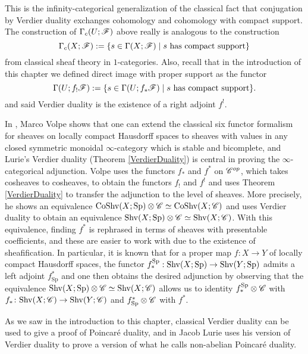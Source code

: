 \documentclass[../../thesis.tex]{subfiles}
\begin{document}
\begin{remark}
    This is the infinity-categorical generalization of the classical fact that conjugation by Verdier duality exchanges cohomology and cohomology with compact support.
    The construction of $\Gamma_c(U;\mathscr{F})$ above really is analogous to the construction
    \[
        \Gamma_c(X ; \mathscr{F}) := \{ s \in \Gamma(X; \mathscr{F}) \mid s\text{ has compact support}\}
    \]
    from classical sheaf theory in $1$-categories.
    Also, recall that in the introduction of this chapter we defined direct image with proper support as the functor
    \[
        \Gamma(U; f_!\mathscr{F}) : = \{ s \in \Gamma(U; f_*\mathscr{F}) \mid s \text{ has compact support}\}.
    \]
    and said Verdier duality is the existence of a right adjoint $f^!$.


    In \cite{Volpe}, Marco Volpe shows that one can extend the classical six functor formalism for sheaves on locally compact Hausdorff spaces to sheaves with values in any closed symmetric monoidal $\infty$-category which is stable and bicomplete, and Lurie's Verdier duality (Theorem \ref{VerdierDuality}) is central in proving the $\infty$-categorical adjunction.
    Volpe uses the functors $f_*$ and $f^*$ on $\mathscr{C}^{op}$, which takes cosheaves to cosheaves, to obtain the functors $f_!$ and $f^!$ and uses Theorem \ref{VerdierDuality} to transfer the adjunction to the level of sheaves.
    More precisely, he shows an equivalence $\operatorname{CoShv}(X ; \mathrm{Sp}) \otimes \mathscr{C} \simeq \operatorname{CoShv}(X ; \mathscr{C})$ and uses Verdier duality to obtain an equivalence $\mathrm{Shv}(X;\mathrm{Sp})\otimes \mathscr{C} \simeq \mathrm{Shv}(X;\mathscr{C})$.
    With this equivalence, finding $f^*$ is rephrased in terms of sheaves with presentable coefficients, and these are easier to work with due to the existence of sheafification.
    In particular, it is known that for a proper map $f\colon X\to Y$ of locally compact Hausdorff spaces, the functor $f_*^{\mathrm{Sp}}:\mathrm{Shv}(X;\mathrm{Sp})\to \mathrm{Shv}(Y;\mathrm{Sp})$ admits a left adjoint $f_{\mathrm{Sp}}^*$ and one then obtains the desired adjunction by observing that the equivalence $\mathrm{Shv}(X;\mathrm{Sp})\otimes \mathscr{C} \simeq \mathrm{Shv}(X;\mathscr{C})$ allows us to identity $f_*^{\mathrm{Sp}}\otimes \mathscr{C}$ with $f_*\colon \mathrm{Shv}(X;\mathscr{C}) \to \mathrm{Shv}(Y;\mathscr{C})$ and $f_{\mathrm{Sp}}^* \otimes \mathscr{C}$ with $f^*$.
\end{remark}
\begin{remark}
    As we saw in the introduction to this chapter, classical Verdier duality can be used to give a proof of Poincaré duality, and in \cite[Section 5.5.6]{HA} Jacob Lurie uses his version of Verdier duality to prove a version of what he calls non-abelian Poincaré duality.
\end{remark}
\end{document}
